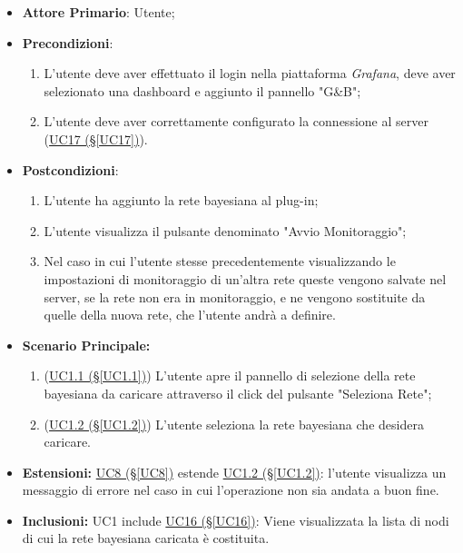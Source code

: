 \begin{itemize}
	\item \textbf{Attore Primario}: Utente;
	\item \textbf{Precondizioni}:
		\begin{enumerate}
			\item L'utente deve aver effettuato il login nella piattaforma \textit{Grafana}, deve aver selezionato una dashboard e aggiunto il pannello "G\&B";
			\item L'utente deve aver correttamente configurato la connessione al server (\hyperref[UC17]{UC17 (§\ref*{UC17})}).
		\end{enumerate}
	\item \textbf{Postcondizioni}:
	\begin{enumerate}
		\item L'utente ha aggiunto la rete bayesiana al plug-in;
		\item L'utente visualizza il pulsante denominato "Avvio Monitoraggio";
		\item Nel caso in cui l'utente stesse precedentemente visualizzando le impostazioni di monitoraggio di un'altra rete queste vengono salvate nel server, se la rete non era in monitoraggio, e ne vengono sostituite da quelle della nuova rete, che l'utente andrà a definire.
	\end{enumerate}
	\item \textbf{Scenario Principale:}
	\begin{enumerate}
		\item (\hyperref[UC1.1]{UC1.1 (§\ref*{UC1.1})}) L'utente apre il pannello di selezione della rete bayesiana da caricare attraverso il click del pulsante "Seleziona Rete";
		\item (\hyperref[UC1.2]{UC1.2 (§\ref*{UC1.2})}) L'utente seleziona la rete bayesiana che desidera caricare.
	\end{enumerate}
	\item \textbf{Estensioni:} \hyperref[UC8]{UC8 (§\ref*{UC8})} estende \hyperref[UC1.2]{UC1.2 (§\ref*{UC1.2})}: l'utente visualizza un messaggio di errore nel caso in cui l'operazione non sia andata a buon fine.
	\item \textbf{Inclusioni:} UC1 include \hyperref[UC16]{UC16 (§\ref*{UC16})}: Viene visualizzata la lista di nodi di cui la rete bayesiana caricata è costituita.
\end{itemize}

\pagebreak

